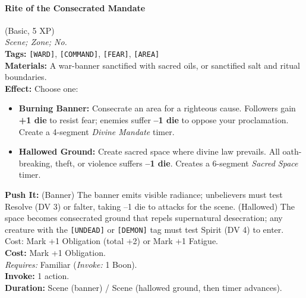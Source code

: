 \paragraph{Rite of the Consecrated Mandate} (Basic, 5 XP) \hfill \\
\emph{Scene; Zone; No.} \\
\textbf{Tags:} \texttt{[WARD]}, \texttt{[COMMAND]}, \texttt{[FEAR]}, \texttt{[AREA]} \\
\textbf{Materials:} A war-banner sanctified with sacred oils, or sanctified salt and ritual boundaries. \\
\textbf{Effect:} Choose one:
\begin{itemize}
  \item \textbf{Burning Banner:} Consecrate an area for a righteous cause. Followers gain \textbf{+1 die} to resist fear; enemies suffer \textbf{--1 die} to oppose your proclamation. Create a 4-segment \textit{Divine Mandate} timer.
  \item \textbf{Hallowed Ground:} Create sacred space where divine law prevails. All oath-breaking, theft, or violence suffers \textbf{--1 die}. Creates a 6-segment \textit{Sacred Space} timer.
\end{itemize}
\textbf{Push It:} (Banner) The banner emits visible radiance; unbelievers must test Resolve (DV 3) or falter, taking --1 die to attacks for the scene. (Hallowed) The space becomes consecrated ground that repels supernatural desecration; any creature with the \texttt{[UNDEAD]} or \texttt{[DEMON]} tag must test Spirit (DV 4) to enter. Cost: Mark +1 Obligation (total +2) or Mark +1 Fatigue. \\
\textbf{Cost:} Mark +1 Obligation. \\
\textit{Requires:} Familiar (\textit{Invoke:} 1 Boon). \\
\textbf{Invoke:} 1 action. \\
\textbf{Duration:} Scene (banner) / Scene (hallowed ground, then timer advances).


